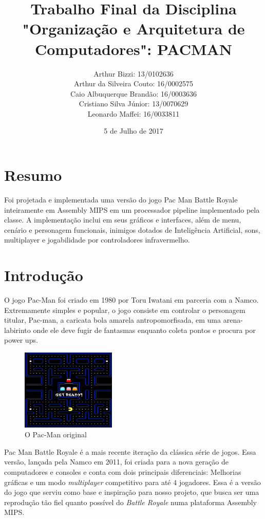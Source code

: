 \documentclass[12pt, a4paper, twocolumn]{article}
\begin{document}
\title{Trabalho Final da Disciplina "Organização e Arquitetura de Computadores": PACMAN}
\author{
Arthur Bizzi: 13/0102636 \\
Arthur da Silveira Couto: 16/0002575 \\
Caio Albuquerque Brandão: 16/0003636 \\
Cristiano Silva Júnior: 13/0070629 \\
Leonardo Maffei: 16/0033811 \\}
\date{5 de Julho de 2017}
\maketitle

\section{Resumo}
Foi projetada e implementada uma versão do jogo Pac Man Battle Royale inteiramente em Assembly MIPS em um processador pipeline implementado pela classe. A implementação inclui em seus gráficos e interfaces, além de menu, cenário e personagem funcionais, inimigos dotados de Inteligência Artificial, sons, multiplayer e jogabilidade por controladores infravermelho.

\section{Introdução}
 O jogo Pac-Man foi criado em 1980 por Toru Iwatani em parceria com a Namco. Extremamente simples e popular, o jogo consiste em controlar o personagem titular, Pac-man, a caricata bola amarela antropomorfisada, em uma arena-labirinto onde ele deve fugir de fantasmas enquanto coleta pontos e procura por power ups.
 
 \begin{figure}[h!]
    \centering
    \includegraphics[width=0.4\textwidth]{pakku.png}
    \caption{O Pac-Man original}
\end{figure}

Pac Man Battle Royale é a mais recente iteração da clássica série de jogos. Essa versão, lançada pela Namco em 2011, foi criada para a nova geração de computadores e consoles e conta com dois principais diferenciais: Melhorias gráficas e um modo \textit{multiplayer} competitivo para até 4 jogadores. Essa é a versão do jogo que serviu como base e inspiração para nosso projeto, que busca ser uma reprodução tão fiel quanto possível do \textit{Battle Royale} numa plataforma Assembly MIPS.
\end{document}
